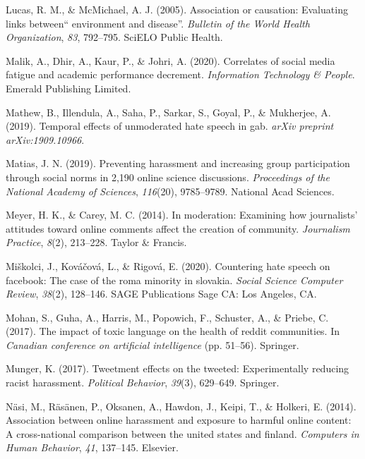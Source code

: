 \documentclass[10pt,dvipsnames]{scrartcl}
\begin{document}
\hypertarget{ref-lucas2005association}{}
Lucas, R. M., \& McMichael, A. J. (2005). Association or causation:
Evaluating links between`` environment and disease''. \emph{Bulletin of
the World Health Organization}, \emph{83}, 792--795. SciELO Public
Health.

\hypertarget{ref-malik2020correlates}{}
Malik, A., Dhir, A., Kaur, P., \& Johri, A. (2020). Correlates of social
media fatigue and academic performance decrement. \emph{Information
Technology \& People}. Emerald Publishing Limited.

\hypertarget{ref-mathew2019temporal}{}
Mathew, B., Illendula, A., Saha, P., Sarkar, S., Goyal, P., \&
Mukherjee, A. (2019). Temporal effects of unmoderated hate speech in
gab. \emph{arXiv preprint arXiv:1909.10966}.

\hypertarget{ref-matias2019preventing}{}
Matias, J. N. (2019). Preventing harassment and increasing group
participation through social norms in 2,190 online science discussions.
\emph{Proceedings of the National Academy of Sciences}, \emph{116}(20),
9785--9789. National Acad Sciences.

\hypertarget{ref-meyer2014moderation}{}
Meyer, H. K., \& Carey, M. C. (2014). In moderation: Examining how
journalists' attitudes toward online comments affect the creation of
community. \emph{Journalism Practice}, \emph{8}(2), 213--228. Taylor \&
Francis.

\hypertarget{ref-mivskolci2020countering}{}
Miškolci, J., Kováčová, L., \& Rigová, E. (2020). Countering hate speech
on facebook: The case of the roma minority in slovakia. \emph{Social
Science Computer Review}, \emph{38}(2), 128--146. SAGE Publications Sage
CA: Los Angeles, CA.

\hypertarget{ref-mohan2017impact}{}
Mohan, S., Guha, A., Harris, M., Popowich, F., Schuster, A., \& Priebe,
C. (2017). The impact of toxic language on the health of reddit
communities. In \emph{Canadian conference on artificial intelligence}
(pp. 51--56). Springer.

\hypertarget{ref-munger2017tweetment}{}
Munger, K. (2017). Tweetment effects on the tweeted: Experimentally
reducing racist harassment. \emph{Political Behavior}, \emph{39}(3),
629--649. Springer.

\hypertarget{ref-nasi2014association}{}
Näsi, M., Räsänen, P., Oksanen, A., Hawdon, J., Keipi, T., \& Holkeri,
E. (2014). Association between online harassment and exposure to harmful
online content: A cross-national comparison between the united states
and finland. \emph{Computers in Human Behavior}, \emph{41}, 137--145.
Elsevier.
\end{document}
